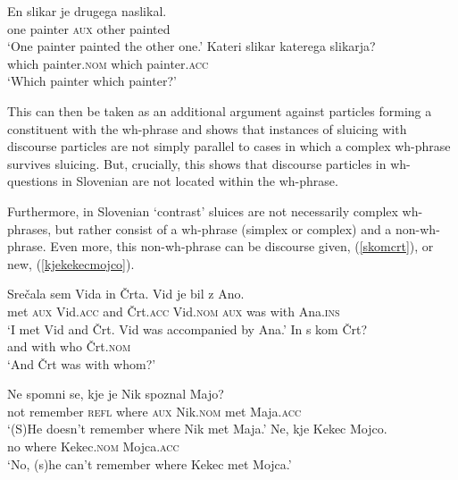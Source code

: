\documentclass[output=paper,
modfonts,
newtxmath,
hidelinks
]{langscibook}
\begin{document}
\begin{exe}
\ex \begin{xlist}
\ex \gll En slikar je drugega naslikal.\\
one painter \textsc{aux} other 	painted\\
\trans `One painter painted the other one.'	 
\ex \label{katerikaterega}
\gll	Kateri slikar katerega slikarja?\\
which painter.\textsc{nom} which painter.\textsc{acc}\\
\trans `Which painter which painter?'
\end{xlist}\end{exe}

\noindent This can then be taken as an additional argument against particles forming a constituent with the wh-phrase and shows that instances of sluicing with  discourse particles are not simply parallel to cases in which a complex wh-phrase survives sluicing. But, crucially, this shows that discourse particles in wh-questions in Slovenian are not located within the wh-phrase. 

Furthermore, in Slovenian `contrast' sluices are not necessarily complex wh-phrases, but rather consist of a wh-phrase (simplex or complex) and a non-wh-phrase. Even more, this non-wh-phrase can be discourse given, (\ref{skomcrt}), or new, (\ref{kjekekecmojco}).

\begin{exe}
\ex \begin{xlist}
\ex \gll Srečala sem Vida in Črta. Vid je bil z Ano.\\
met \textsc{aux} Vid.\textsc{acc} and Črt.\textsc{acc}  Vid.\textsc{nom} \textsc{aux} was with Ana.\textsc{ins} \\
\trans `I met Vid and Črt. Vid was accompanied by Ana.' 
\ex \gll In s kom Črt? \\
	and with who Črt.\textsc{nom}\\
\trans  `And Črt was with whom?'
\end{xlist}
\label{skomcrt}
\ex \begin{xlist}
\ex \gll	Ne spomni se, kje je Nik spoznal Majo? \\
not remember \textsc{refl} where \textsc{aux} Nik.\textsc{nom} met Maja.\textsc{acc}\\
\trans `(S)He doesn't remember where Nik met Maja.'
\ex \gll 	Ne, kje Kekec Mojco.\\
	no where Kekec.\textsc{nom} Mojca.\textsc{acc}\\
\trans 	 `No, (s)he can't remember where Kekec met Mojca.'
\end{xlist}
\label{kjekekecmojco}
\end{exe}
\end{document}
